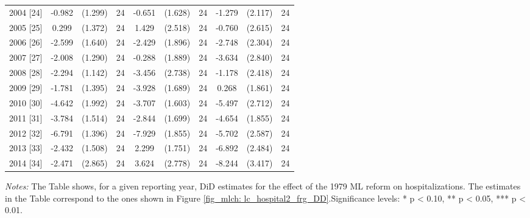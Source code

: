 \begin{table}[H]
\begin{threeparttable}
{\begin{tabular}{l*{9}{c}}
				2004 [24]           &      -0.982         &     (1.299)	& 24	&      -0.651         &     (1.628)		& 24	&      -1.279         &     (2.117)		& 24\\
				2005 [25]           &       0.299         &     (1.372)	& 24	&       1.429         &     (2.518)		& 24	&      -0.760         &     (2.615)		& 24\\
				2006 [26]           &      -2.599         &     (1.640)	& 24	&      -2.429         &     (1.896)		& 24	&      -2.748         &     (2.304)		& 24\\
				2007 [27]           &      -2.008         &     (1.290)	& 24	&      -0.288         &     (1.889)		& 24	&      -3.634         &     (2.840)		& 24\\
				2008 [28]           &      -2.294\sym{*}  &     (1.142)	& 24	&      -3.456         &     (2.738)		& 24	&      -1.178         &     (2.418)		& 24\\
				2009 [29]           &      -1.781         &     (1.395)	& 24	&      -3.928\sym{**} &     (1.689)		& 24	&       0.268         &     (1.861)		& 24\\
				2010 [30]           &      -4.642\sym{**} &     (1.992)	& 24	&      -3.707\sym{**} &     (1.603)		& 24	&      -5.497\sym{*}  &     (2.712)		& 24\\
				2011 [31]           &      -3.784\sym{**} &     (1.514)	& 24	&      -2.844         &     (1.699)		& 24	&      -4.654\sym{**} &     (1.855)		& 24\\
				2012 [32]           &      -6.791\sym{***}&     (1.396)	& 24	&      -7.929\sym{***}&     (1.855)		& 24	&      -5.702\sym{**} &     (2.587)		& 24\\
				2013 [33]           &      -2.432         &     (1.508)	& 24	&       2.299         &     (1.751)		& 24	&      -6.892\sym{**} &     (2.484)		& 24\\
				2014 [34]           &      -2.471         &     (2.865)	& 24	&       3.624         &     (2.778)		& 24	&      -8.244\sym{**} &     (3.417)		& 24\\
				\bottomrule 
		\end{tabular}}
		\begin{tablenotes} 
			\item \scriptsize \emph{Notes:} The Table shows, for a given reporting year, DiD estimates for the effect of the 1979 ML reform on hospitalizations. The estimates in the Table correspond to the ones shown in Figure \ref{fig_mlch: lc_hospital2_frg_DD}.\newline Significance levels: * p < 0.10, ** p < 0.05, *** p < 0.01.
		\end{tablenotes} 
	\end{threeparttable} 
\end{table}